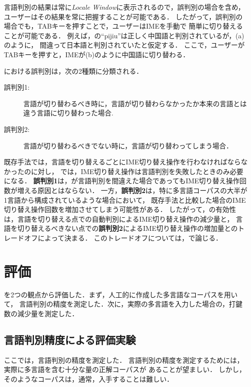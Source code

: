 \documentclass[japanese]{jnlp_1.4}
\newcommand{\name}{}
\newcommand{\secref}[1]{}
\newcommand{\figref}[1]{}
\renewcommand{\text}{}
\begin{document}
言語判別の結果は常に{\em Locale Window}に表示されるので，誤判別の場合を含め，
ユーザーはその結果を常に把握することが可能である．
したがって，誤判別の場合でも，TABキーを押すことで，ユーザーはIMEを手動で
簡単に切り替えることが可能である．
例えば，\figref{fig:entryflow}の``pijiu''は正しく中国語と判別されているが，\figref{fig:detectionfail}(a)のように，
間違って日本語と判別されていたと仮定する．
ここで，ユーザーがTABキーを押すと，IMEが\figref{fig:detectionfail}(b)のように中国語に切り替わる．

{\name}における誤判別は，次の2種類に分類される．
\begin{description} 
\item[誤判別1:] {言語が切り替わるべき時に，言語が切り替わらなかったか本来の言語とは違う言語に切り替わった場合}. 
\item[誤判別2:] {言語が切り替わるべきでない時に，言語が切り替わってしまう場合}．
\end{description} 

既存手法では，言語を切り替えるごとにIME切り替え操作を行わなければならなかったのに対し，
{\name}では，IME切り替え操作は言語判別を失敗したときのみ必要になる．
{\bf 誤判別1}は，{\name}が言語判別を間違えた場合であってもIME切り替え操作回数が増える原因とはならない．
一方，{\bf 誤判別2}は，特に多言語コーパスの大半が1言語から構成されているような場合において，
既存手法と比較した場合のIME切り替え操作回数を増加させてしまう可能性がある．
したがって，{\name}の有効性は，言語を切り替える点での自動判別によるIME切り替え操作の減少量と，
言語を切り替えるべきない点での{\bf 誤判別2}によるIME切り替え操作の増加量とのトレードオフによって決まる．
このトレードオフについては，\secref{sec:decrease}で論じる．


\section{評価} 
\label{sec:evaluation}

{\name}を2つの観点から評価した．まず，人工的に作成した多言語なコーパスを用いて，
言語判別の精度を測定した．次に，実際の多言語{\text}を入力した場合の，打鍵数の減少量を測定した．



\subsection{言語判別精度による評価実験} 
\label{sec:detectionaccuracy}

ここでは，言語判別の精度を測定した．
言語判別の精度を測定するためには，実際に多言語を含む十分な量の正解コーパスが
あることが望ましい．
しかし，そのようなコーパスは，通常，入手することは難しい．
\end{document}
